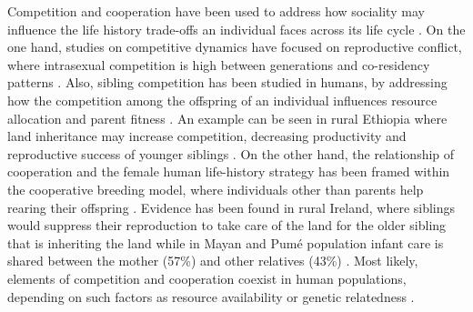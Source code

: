 \documentclass{article}
\begin{document}
Competition and cooperation have been used to address how sociality may influence the life history trade-offs an individual faces across its life cycle \citep{cant2008reproductive,kramer2005children}. On the one hand, studies on competitive dynamics have focused on reproductive conflict, where intrasexual competition is high between generations \citep{mace2012female,lahdenpera2012severe} and co-residency patterns \citep{pettay2016costly}. Also, sibling competition has been studied in humans, by addressing how the competition among the offspring of an individual influences resource allocation and parent fitness \citep{lawson2009trade}. An example can be seen in rural Ethiopia where land inheritance may increase competition, decreasing productivity and reproductive success of younger siblings \citep{gibson2011land}. On the other hand, the relationship of cooperation and the female human life-history strategy has been framed within the cooperative breeding model, where individuals other than parents help rearing their offspring \citep{hrdy2007evolutionary}. Evidence has been found in rural Ireland, where siblings would suppress their reproduction to take care of the land for the older sibling that is inheriting the land \citep{strassmann1998ecological} while in Mayan and Pumé population infant care is shared between the mother (57\%) and other relatives (43\%) \citep{kramer2018infant}. Most likely, elements of competition and cooperation coexist in human populations, depending on such factors as resource availability \citep{mulder2007hamilton} or genetic relatedness \citep{strassmann2011cooperation}. 
\\\\
\end{document}
